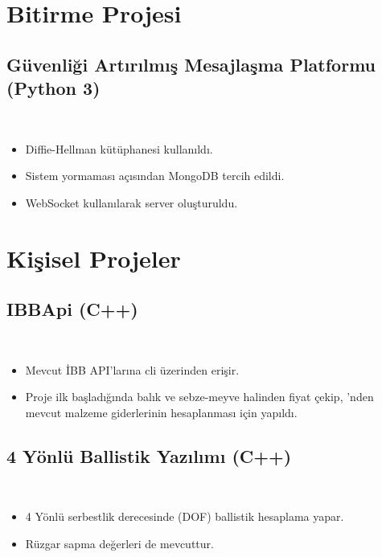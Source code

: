 \documentclass[a4paper, 9pt]{extarticle}
\begin{document}
\makebaslik{}
\myegitim{}
\mydeneyim{}

\section{Bitirme Projesi}

\subsection{Güvenliği Artırılmış Mesajlaşma Platformu (Python 3)}
\hfill \\
\begin{itemize}
	\item Diffie-Hellman kütüphanesi kullanıldı.
	\item Sistem yormaması açısından MongoDB tercih edildi.
	\item WebSocket kullanılarak server oluşturuldu.
\end{itemize}

\section{Kişisel Projeler}

\subsection{IBBApi (C++)} \hfill \\
\begin{itemize}
	\item Mevcut İBB API'larına cli üzerinden erişir.
	\item Proje ilk başladığında balık ve sebze-meyve halinden fiyat çekip,
	'nden mevcut malzeme giderlerinin hesaplanması için yapıldı.
\end{itemize}

\subsection{4 Yönlü Ballistik Yazılımı (C++)} \hfill \\
\begin{itemize}
	\item 4 Yönlü serbestlik derecesinde (DOF) ballistik hesaplama yapar.
	\item Rüzgar sapma değerleri de mevcuttur.
\end{itemize}
\end{document}
